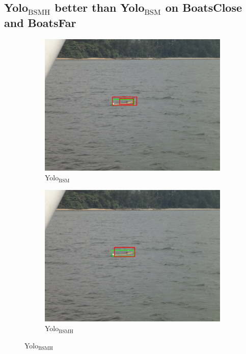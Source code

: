 \subsection{Yolo$_{\text{BSMH}}$ better than Yolo$_{\text{BSM}}$ on BoatsClose and BoatsFar}
\label{sec:3better}
\begin{figure}[h!]
\begin{subfigure}{.5\textwidth}
  \centering
  \includegraphics[width=0.9\linewidth]{results/case_buildings/yolo23/3better/yolo2/DSC02490.jpg}
  \caption{Yolo$_{\text{BSM}}$}
\end{subfigure}%
\begin{subfigure}{.5\textwidth}
  \centering
  \includegraphics[width=.9\linewidth]{results/case_buildings/yolo23/3better/yolo3/DSC02490.jpg}
  \caption{Yolo$_{\text{BSMH}}$}
\end{subfigure}


\end{figure}
